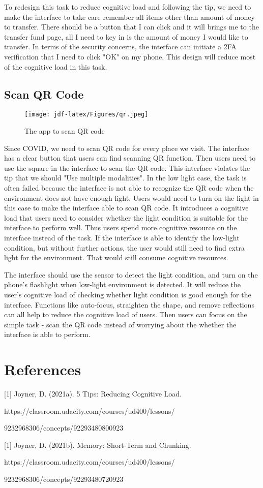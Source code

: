 \documentclass[
	letterpaper, %
]{jdf}
\begin{document}
To redesign this task to reduce cognitive load and following the tip, we need to make the interface to take care remember all items other than amount of money to transfer. There should be a button that I can click and it will brings me to the transfer fund page, all I need to key in is the amount of money I would like to transfer. In terms of the security concerns, the interface can initiate a 2FA verification that I need to click "OK" on my phone. This design will reduce most of the cognitive load in this task. 

\subsection{Scan QR Code}
\begin{figure}[h]
	\centering
	\texttt{[image: jdf-latex/Figures/qr.jpeg]}
	\caption{The app to scan QR code}
	\label{fig:qr}
\end{figure}
Since COVID, we need to scan QR code for every place we visit. The interface has a clear button that users can find scanning QR function. Then users need to use the square in the interface to scan the QR code. This interface violates the tip that we should "Use multiple modalities". In the low light case, the task is often failed because the interface is not able to recognize the QR code when the environment does not have enough light. Users would need to turn on the light in this case to make the interface able to scan QR code. It introduces a cognitive load that users need to consider whether the light condition is suitable for the interface to perform well. Thus users spend more cognitive resource on the interface instead of the task. If the interface is able to identify the low-light condition, but without further actions, the user would still need to find extra light for the environment. That would still consume cognitive resources.

The interface should use the sensor to detect the light condition, and turn on the phone's flashlight when low-light environment is detected. It will reduce the user's cognitive load of checking whether light condition is good enough for the interface. Functions like auto-focus, straighten the shape, and remove reflections can all help to reduce the cognitive load of users. Then users can focus on the simple task - scan the QR code instead of worrying about the whether the interface is able to perform.

\section{References}
[1] Joyner, D. (2021a). 5 Tips: Reducing Cognitive Load.

https://classroom.udacity.com/courses/ud400/lessons/

9232968306/concepts/92293480800923

[1] Joyner, D. (2021b). Memory: Short-Term and Chunking.

https://classroom.udacity.com/courses/ud400/lessons/

9232968306/concepts/92293480720923
\end{document}
